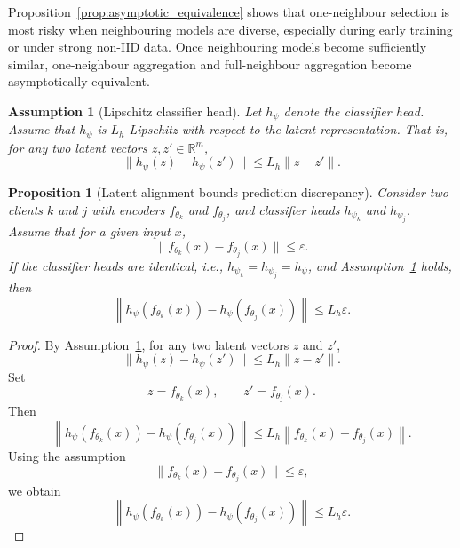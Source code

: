 \documentclass[conference]{IEEEtran}
\newtheorem{assumption}{Assumption}
\newtheorem{proposition}{Proposition}
\begin{document}
Proposition~\ref{prop:asymptotic_equivalence} shows that one-neighbour selection is most risky when neighbouring models are diverse, especially during early training or under strong non-IID data. Once neighbouring models become sufficiently similar, one-neighbour aggregation and full-neighbour aggregation become asymptotically equivalent.

\begin{assumption}[Lipschitz classifier head]
\label{ass:lipschitz_classifier}
Let $h_{\psi}$ denote the classifier head. Assume that $h_{\psi}$ is $L_h$-Lipschitz with respect to the latent representation. That is, for any two latent vectors $z,z'\in\mathbb{R}^m$,
\begin{equation}
\|h_{\psi}(z)-h_{\psi}(z')\|
\leq
L_h\|z-z'\|.
    \label{eq:auto-075}
\end{equation}
\end{assumption}

\begin{proposition}[Latent alignment bounds prediction discrepancy]
\label{prop:latent_alignment}
Consider two clients $k$ and $j$ with encoders $f_{\theta_k}$ and $f_{\theta_j}$, and classifier heads $h_{\psi_k}$ and $h_{\psi_j}$. Assume that for a given input $x$,
\begin{equation}
\|f_{\theta_k}(x)-f_{\theta_j}(x)\|
\leq
\varepsilon.
    \label{eq:auto-076}
\end{equation}
If the classifier heads are identical, i.e., $h_{\psi_k}=h_{\psi_j}=h_{\psi}$, and Assumption~\ref{ass:lipschitz_classifier} holds, then
\begin{equation}
\left\|
h_{\psi}(f_{\theta_k}(x))
-
h_{\psi}(f_{\theta_j}(x))
\right\|
\leq
L_h\varepsilon.
    \label{eq:auto-077}
\end{equation}
\end{proposition}

\begin{proof}
By Assumption~\ref{ass:lipschitz_classifier}, for any two latent vectors $z$ and $z'$,
\begin{equation}
\|h_{\psi}(z)-h_{\psi}(z')\|
\leq
L_h\|z-z'\|.
    \label{eq:auto-078}
\end{equation}
Set
\begin{equation}
z=f_{\theta_k}(x),
\qquad
z'=f_{\theta_j}(x).
    \label{eq:auto-079}
\end{equation}
Then
\begin{equation}
\left\|
h_{\psi}(f_{\theta_k}(x))
-
h_{\psi}(f_{\theta_j}(x))
\right\|
\leq
L_h
\left\|
f_{\theta_k}(x)-f_{\theta_j}(x)
\right\|.
    \label{eq:auto-080}
\end{equation}
Using the assumption
\begin{equation}
\|f_{\theta_k}(x)-f_{\theta_j}(x)\|
\leq
\varepsilon,
    \label{eq:auto-081}
\end{equation}
we obtain
\begin{equation}
\left\|
h_{\psi}(f_{\theta_k}(x))
-
h_{\psi}(f_{\theta_j}(x))
\right\|
\leq
L_h\varepsilon.
    \label{eq:auto-082}
\end{equation}
\end{proof}
\end{document}
